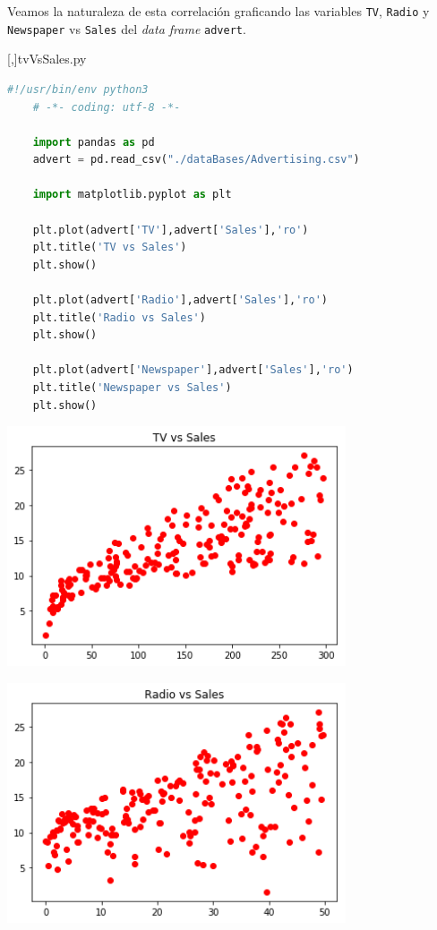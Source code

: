 Veamos la naturaleza de esta correlación graficando las variables \texttt{TV}, \texttt{Radio} y \texttt{Newspaper} vs \texttt{Sales} del \textit{data frame} \texttt{advert}.

[,]{tvVsSales.py}
\begin{lstlisting}[language=Python]
	#!/usr/bin/env python3
	# -*- coding: utf-8 -*-
	
	import pandas as pd
	advert = pd.read_csv("./dataBases/Advertising.csv")
	
	import matplotlib.pyplot as plt
	
	plt.plot(advert['TV'],advert['Sales'],'ro')
	plt.title('TV vs Sales')
	plt.show()
	
	plt.plot(advert['Radio'],advert['Sales'],'ro')
	plt.title('Radio vs Sales')
	plt.show()
	
	plt.plot(advert['Newspaper'],advert['Sales'],'ro')
	plt.title('Newspaper vs Sales')
	plt.show()
\end{lstlisting}


\begin{center}
	\includegraphics[width=10cm,keepaspectratio=true]{./images/tvVsSales.png}
\end{center}


\begin{center}
	\includegraphics[width=10cm,keepaspectratio=true]{./images/radioVsSales.png}
\end{center}


